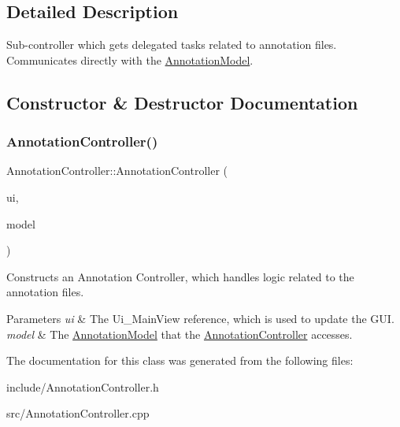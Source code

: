 \subsection{Detailed Description}
Sub-\/controller which gets delegated tasks related to annotation files. Communicates directly with the \hyperlink{classAnnotationModel}{Annotation\+Model}. 

\subsection{Constructor \& Destructor Documentation}
\mbox{\label{classAnnotationController_a28cad1eb39c829d54093a965f59cdb2e}} 
\subsubsection{\texorpdfstring{Annotation\+Controller()}{AnnotationController()}}
{\footnotesize\ttfamily Annotation\+Controller\+::\+Annotation\+Controller (\begin{DoxyParamCaption}\item[{const Ui\+\_\+\+Main\+View \&}]{ui,  }\item[{const \hyperlink{classAnnotationModel}{Annotation\+Model} \&}]{model }\end{DoxyParamCaption})}



Constructs an Annotation Controller, which handles logic related to the annotation files. 


\begin{DoxyParams}{Parameters}
{\em ui} & The Ui\+\_\+\+Main\+View reference, which is used to update the G\+UI. \\
\hline
{\em model} & The \hyperlink{classAnnotationModel}{Annotation\+Model} that the \hyperlink{classAnnotationController}{Annotation\+Controller} accesses. \\
\hline
\end{DoxyParams}


The documentation for this class was generated from the following files\+:\begin{DoxyCompactItemize}
\item 
include/Annotation\+Controller.\+h\item 
src/Annotation\+Controller.\+cpp\end{DoxyCompactItemize}
